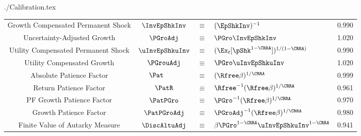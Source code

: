 \documentclass[titlepage,abstract]{bejournal}
\begin{document}
\begin{verbatimwrite}{./Calibration.tex}
\begin{table}
\begin{center}
\begin{tabular}{|c|ccl|c|}
Growth Compensated Permanent Shock            & $\InvEpShkInv $ & $\equiv$ & $ (\EpShkInv)^{-1}$               & 0.990 \\
Uncertainty-Adjusted Growth                 & $\PGroAdj $ & $\equiv$ & $ \PGro \InvEpShkInv$        & 1.020 \\
Utility Compensated Permanent Shock                & $\uInvEpShkuInv $ & $\equiv$ & $ (\Ex_{t}[\pShk^{1-\CRRA}])^{1/(1-\CRRA)}$ & 0.990 \\
Utility Compensated Growth                     & $\PGrouAdj $ & $\equiv$ & $ \PGro \uInvEpShkuInv$        & 1.020 \\
Absolute Patience Factor                    & $\Pat_{\phantom{\Rfree}} $ & $\equiv$ & $ (\Rfree \beta)^{1/\CRRA}$                & 0.999 \\
Return Patience Factor                      & $\PatR$ & $\equiv$ & $\Rfree^{-1}(\Rfree \beta)^{1/\CRRA} $     & 0.961 \\
PF Growth Patience Factor    & $\PatPGro$ & $\equiv$ & $\PGro^{-1}(\Rfree \beta)^{1/\CRRA} $      & 0.970 \\
Growth Patience Factor                      & $\PatPGroAdj$ & $\equiv$ & $ \PGroAdj^{-1}(\Rfree \beta)^{1/\CRRA}$& 0.980 \\
Finite Value of Autarky Measure         & $\DiscAltuAdj $ & $\equiv$ & $ \beta \PGro^{1-\CRRA}\uInvEpShkuInv^{1-\CRRA}$       & 0.941 \\ \hline
\end{tabular}
\end{center}
\end{table}
\end{verbatimwrite}


\end{document}
